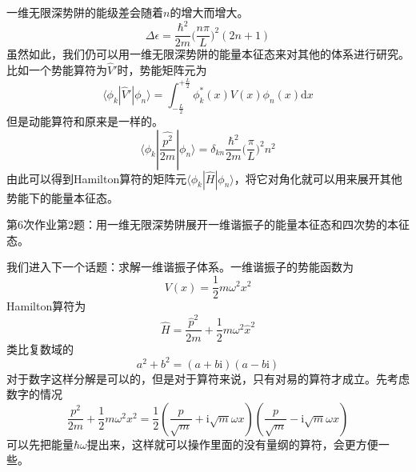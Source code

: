        一维无限深势阱的能级差会随着$n$的增大而增大。
        \[ \Delta \epsilon = \frac {\hbar^2}{2m} \bigg(\frac {n\pi}L \bigg)^2 (2n+1) \]
        虽然如此，我们仍可以用一维无限深势阱的能量本征态来对其他的体系进行研究。比如一个势能算符为$\hat{V}'$时，势能矩阵元为
        \[
            \langle \phi_k | \hat{V}' | \phi_n \rangle = \int_{-\frac L2}^{+\frac L2} \phi_k^*(x) V(x) \phi_n(x) \mathrm{d}x 
        \]
        但是动能算符和原来是一样的。
        \[
            \langle \phi_k | \frac {\hat{p^2}}{2m} | \phi_n \rangle = \delta_{kn} \frac {\hbar^2}{2m} \bigg( \frac {\pi}L \bigg)^2 n^2
        \]
        由此可以得到Hamilton算符的矩阵元$\langle \phi_k | \hat{H} | \phi_n \rangle$，将它对角化就可以用来展开其他势能下的能量本征态。
        \begin{asg}
            第6次作业第2题：用一维无限深势阱展开一维谐振子的能量本征态和四次势的本征态。
        \end{asg}

        我们进入下一个话题：求解一维谐振子体系。一维谐振子的势能函数为
        \[ V(x) = \frac 12 m\omega^2x^2 \]
        Hamilton算符为
        \[ \hat{H} = \frac {\hat{p}^2}{2m} + \frac 12 m\omega^2 \hat{x}^2 \]
        类比复数域的
        \[ a^2 + b^2 = (a+b\mathrm{i})(a-b\mathrm{i}) \]
        对于数字这样分解是可以的，但是对于算符来说，只有对易的算符才成立。先考虑数字的情况
        \[ \frac {p^2}{2m} + \frac 12 m\omega^2 x^2 = \frac 12 (\frac p{\sqrt{m}} + \mathrm{i}\sqrt{m}\omega x)(\frac p{\sqrt{m}} - \mathrm{i}\sqrt{m}\omega x) \]
        可以先把能量$\hbar \omega$提出来，这样就可以操作里面的没有量纲的算符，会更方便一些。

